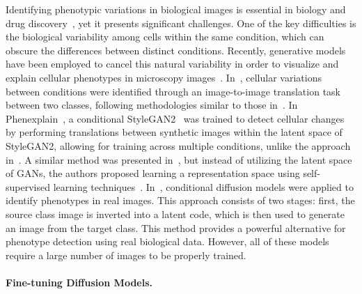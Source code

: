 Identifying phenotypic variations in biological images is essential in biology and drug discovery~\cite{cellular_profiling,cellular_profiling_2}, yet it presents significant challenges. One of the key difficulties is the biological variability among cells within the same condition, which can obscure the differences between distinct conditions. Recently, generative models have been employed to cancel this natural variability in order to visualize and explain cellular phenotypes in microscopy images~\cite{Lamiable2023,unbiased_cell,bourou_1}. In~\cite{bourou_1}, cellular variations between conditions were identified through an image-to-image translation task between two classes, following methodologies similar to those in~\cite{cyclegan,pixtopix}. In Phenexplain~\cite{Lamiable2023}, a conditional StyleGAN2~\cite{stylegan2} was trained to detect cellular changes by performing translations between synthetic images within the latent space of StyleGAN2, allowing for training across multiple conditions, unlike the approach in~\cite{bourou_1}. A similar method was presented in~\cite{unbiased_cell}, but instead of utilizing the latent space of GANs, the authors proposed learning a representation space using self-supervised learning techniques~\cite{self_supervised_survey}. In~\cite{bourou_2}, conditional diffusion models were applied to identify phenotypes in real images. This approach consists of two stages: first, the source class image is inverted into a latent code, which is then used to generate an image from the target class. This method provides a powerful alternative for phenotype detection using real biological data. However, all of these models require a large number of images to be properly trained.

\paragraph{Fine-tuning Diffusion Models.}


